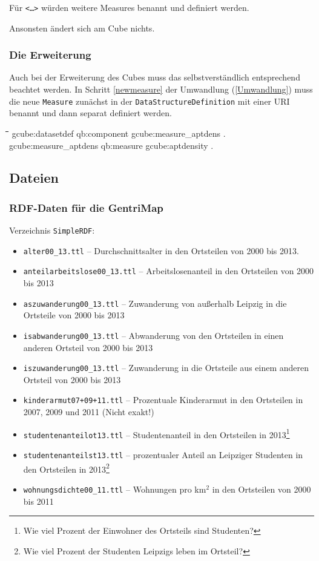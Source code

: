 \documentclass[a4paper,11pt]{article}
\newenvironment{code}{\tt \begin{tabbing}
\hskip12pt\=\hskip12pt\=\hskip12pt\=\hskip12pt\=\hskip5cm\=\hskip5cm\=\kill}
{\end{tabbing}}
\begin{document}
Für \texttt{<\ldots>} würden weitere Measures benannt und definiert werden.

Ansonsten ändert sich am Cube nichts.

\subsubsection{Die Erweiterung}

Auch bei der Erweiterung des Cubes muss das selbstverständlich entsprechend
beachtet werden. In Schritt \ref{newmeasure} der Umwandlung (\ref{Umwandlung})
muss die neue \texttt{Measure} zunächst in der
\texttt{DataStruc\-ture\-Definition} mit einer URI benannt und dann separat
definiert werden.

\begin{code}
gcube:datasetdef qb:component gcube:measure\_aptdens .\\
gcube:measure\_aptdens  qb:measure gcube:aptdensity .
\end{code}

\subsection{Dateien}

\subsubsection{RDF-Daten für die GentriMap}

Verzeichnis \texttt{SimpleRDF}:
\begin{itemize}
\setlength{\itemsep}{-2pt}
\item \texttt{alter00\_13.ttl} -- Durchschnittsalter in den Ortsteilen von 2000
  bis 2013.
\item \texttt{anteilarbeitslose00\_13.ttl} -- Arbeitslosenanteil in den
  Ortsteilen von 2000 bis 2013
\item \texttt{aszuwanderung00\_13.ttl} -- Zuwanderung von außerhalb Leipzig in
  die Ortsteile von 2000 bis 2013
\item \texttt{isabwanderung00\_13.ttl} -- Abwanderung von den Ortsteilen in
  einen anderen Ortsteil von 2000 bis 2013
\item \texttt{iszuwanderung00\_13.ttl} -- Zuwanderung in die Ortsteile aus
  einem anderen Ortsteil von 2000 bis 2013
\item \texttt{kinderarmut07+09+11.ttl} -- Prozentuale Kinderarmut in den
  Ortsteilen in 2007, 2009 und 2011 (Nicht exakt!)
\item \texttt{studentenanteilot13.ttl} -- Studentenanteil in den Ortsteilen in
  2013\footnote{Wie viel Prozent der Einwohner des Ortsteils sind Studenten?}
\item \texttt{studentenanteilst13.ttl} -- prozentualer Anteil an Leipziger
  Studenten in den Ortsteilen in 2013\footnote{Wie viel Prozent der Studenten
    Leipzigs leben im Ortsteil?}
\item \texttt{wohnungsdichte00\_11.ttl} -- Wohnungen pro km$^2$ in den
  Ortsteilen von 2000 bis 2011
\end{itemize}
\end{document}
